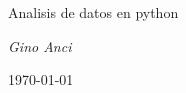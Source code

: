 \documentclass[12pt,a4paper]{report}
\begin{document}
\begin{titlepage}
    \centering
    \vspace*{\fill}
    {\Huge \ttfamily Analisis de datos en python \par}
    \vspace{2cm}
    {\large \itshape Gino Anci \par}
    {\small\today\par}
    \vspace*{\fill}
\end{titlepage}

\tableofcontents





\end{document}
